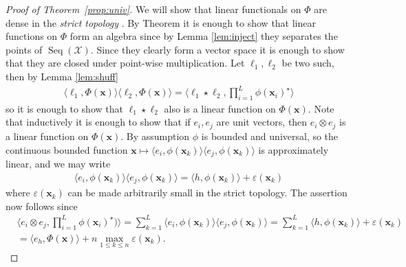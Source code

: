 \documentclass{article} \usepackage{iclr2021_conference,times}
\newcommand{\bx}{\mathbf{x}}
\newcommand{\cX}{\mathcal{X}}
\newcommand{\Seq}[1]{\operatorname{Seq}(#1)}
\theoremstyle{plain}
\theoremstyle{definition}
\begin{document}
\begin{proof}[Proof of Theorem~\ref{prop:univ}]
		We will show that linear functionals on $ \Phi $ are dense in the \emph{strict topology} \citep{Giles71}. By Theorem \cite[Theorem 3.1]{Giles71} it is enough to show that linear functions on $ \Phi $ form an algebra since by Lemma \ref{lem:inject} they separates the points of $ \Seq{\cX} $. Since they clearly form a vector space it is enough to show that they are closed under point-wise multiplication. Let $ \ell_1,\ell_2 $ be two such, then by Lemma \ref{lem:shuff}
		\begin{align}
		\langle \ell_1, \Phi(\bx) \rangle \langle \ell_2, \Phi(\bx) \rangle = \langle \ell_1\star \ell_2, \prod_{i=1}^L \phi(\bx_i)^\star \rangle
		\end{align}
		so it is enough to show that $ \ell_1\star \ell_2 $ also is a linear function on $\Phi(\bx) $. Note that inductively it is enough to show that if $ e_i,e_j $ are unit vectors, then $ e_i\otimes e_j $ is a linear function on $\Phi(\bx) $. By assumption $ \phi $ is bounded and universal, so the continuous bounded function $ \bx \mapsto \langle e_i, \phi(\bx_k)\rangle \langle e_j,\phi(\bx_k)\rangle $ is approximately linear, and we may write
		\begin{align}
		\langle e_i, \phi(\bx_k)\rangle \langle e_j,\phi(\bx_k)\rangle = \langle h, \phi(\bx_k) \rangle + \varepsilon(\bx_k)
		\end{align}
		where $ \varepsilon(\bx_k) $ can be made arbitrarily small in the strict topology. The assertion now follows since
		\begin{align}
		&\langle e_i\otimes e_j, \prod_{i=1}^L \phi(\bx_i)^\star) \rangle = \sum_{k=1}^L \langle e_i, \phi(\bx_k)\rangle \langle e_j,\phi(\bx_k)\rangle = \sum_{k=1}^L \langle h, \phi(\bx_k)\rangle + \varepsilon(\bx_k) \\
		&= \langle e_{h}, \Phi(\bx) \rangle + n\max_{1\leq k\leq n}\varepsilon(\bx_k).
		\end{align}
	\end{proof}
	
\end{document}
